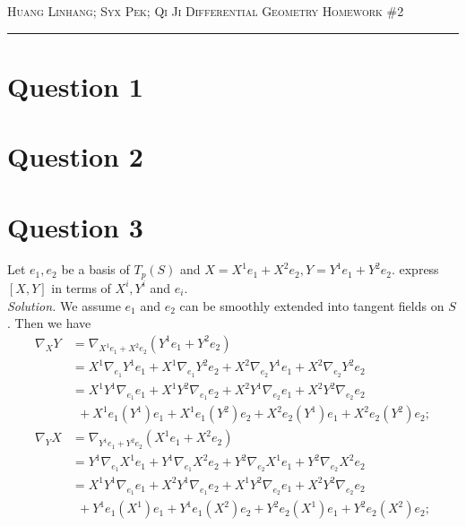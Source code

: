 \documentclass[12pt]{article}
\begin{document}
\thispagestyle{empty}

{\scshape Huang Linhang; Syx Pek; Qi Ji} \hfill {\scshape \large Differential Geometry} \hfill {\scshape Homework \#2}
 
\smallskip
\hrule
\bigskip

\section*{Question 1}

\section*{Question 2}

\section*{Question 3}
Let $e_1,e_2$ be a basis of $T_p(S)$ and $X=X^1e_1+X^2e_2, Y=Y^1e_1+Y^2e_2$. express $[X,Y]$ in terms of $X^i, Y^i$ and $e_i$.
\\
\textit{Solution.} We assume $e_1$ and $e_2$ can be smoothly extended into tangent fields on $S$. Then we have
\begin{align*}
    \nabla_XY &= \nabla_{X^1e_1+X^2e_2}(Y^1e_1+Y^2e_2)\\
    &=X^1\nabla_{e_1}Y^1e_1 + X^1\nabla_{e_1}Y^2e_2 +
    X^2\nabla_{e_2}Y^1e_1 + X^2\nabla_{e_2}Y^2e_2\\
    &=X^1Y^1\nabla_{e_1}e_1 + X^1Y^2\nabla_{e_1}e_2 +
    X^2Y^1\nabla_{e_2}e_1 + X^2Y^2\nabla_{e_2}e_2\\
    &~~+X^1e_1(Y^1)e_1 + X^1e_1(Y^2)e_2+ X^2e_2(Y^1)e_1+X^2e_2(Y^2)e_2;\\
    \nabla_YX &= \nabla_{Y^1e_1+Y^2e_2}(X^1e_1+X^2e_2)\\
    &=Y^1\nabla_{e_1}X^1e_1 + Y^1\nabla_{e_1}X^2e_2 +
    Y^2\nabla_{e_2}X^1e_1 + Y^2\nabla_{e_2}X^2e_2\\
    &=X^1Y^1\nabla_{e_1}e_1 + X^2Y^1\nabla_{e_1}e_2 +
    X^1Y^2\nabla_{e_2}e_1 + X^2Y^2\nabla_{e_2}e_2\\
    &~~+Y^1e_1(X^1)e_1 + Y^1e_1(X^2)e_2+ Y^2e_2(X^1)e_1+Y^2e_2(X^2)e_2;\\
\end{align*}
\end{document}
